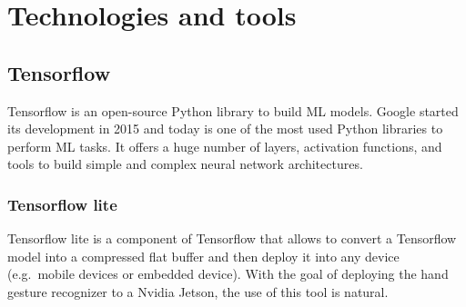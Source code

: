 \documentclass[../thesis.tex]{subfiles}
\begin{document}
\chapter{Technologies and tools}\label{cap:technologies-and-tools}

\section{Tensorflow}
Tensorflow is an open-source Python library to build \acrshort{ML} models. Google started its development in 2015 and today is one of the most used Python libraries to perform \acrshort{ML} tasks. It offers a huge number of layers, activation functions, and tools to build simple and complex neural network architectures.

\subsection{Tensorflow lite}
Tensorflow lite is a component of Tensorflow that allows to convert a Tensorflow model into a compressed flat buffer and then deploy it into any device (e.g.\ mobile devices or embedded device). With the goal of deploying the hand gesture recognizer to a Nvidia Jetson, the use of this tool is natural.
\end{document}
